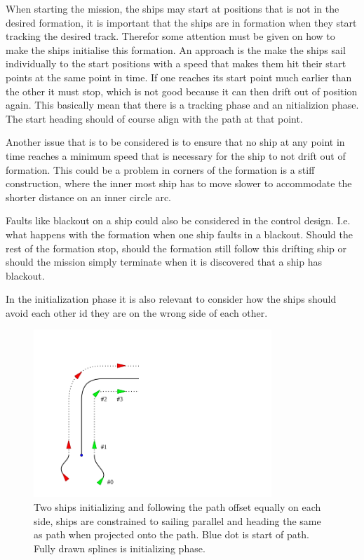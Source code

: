 When starting the mission, the ships may start at positions that
is not in the desired formation, it is important that the ships are in
formation when they start tracking the desired track. Therefor some
attention must be given on how to make the ships initialise this
formation. An approach is the make the ships sail individually to the
start positions with a speed that makes them hit their start points at
the same point in time. If one reaches its start point much earlier
than the other it must stop, which is not good because it can then
drift out of position again. This basically mean that there is a
tracking phase and an nitializion phase. The start heading should of
course align with the path at that point.

Another issue that is to be considered is to ensure that no ship at
any point in time reaches a minimum speed that is necessary for the
ship to not drift out of formation. This could be a problem in corners
of the formation is a stiff construction, where the inner most ship
has to move slower to accommodate the shorter distance on an inner
circle arc.

Faults like blackout on a ship could also be considered in the control
design. I.e. what happens with the formation when one ship faults in a
blackout. Should the rest of the formation stop, should the formation
still follow this drifting ship or should the mission simply terminate
when it is discovered that a ship has blackout.

In the initialization phase it is also relevant to consider how the
ships should avoid each other id they are on the wrong side of each
other.

\begin{figure}[htbp]
	\centering
	\includegraphics[width=0.8\textwidth]{fig/cornoring}
	\caption{Two ships initializing and following the path offset
		equally on each side, ships are constrained to sailing parallel
		and heading the same as path when projected onto the path. Blue
	dot is start of path. Fully drawn splines is initializing phase.}
	\label{fig:cornoring}
\end{figure}

